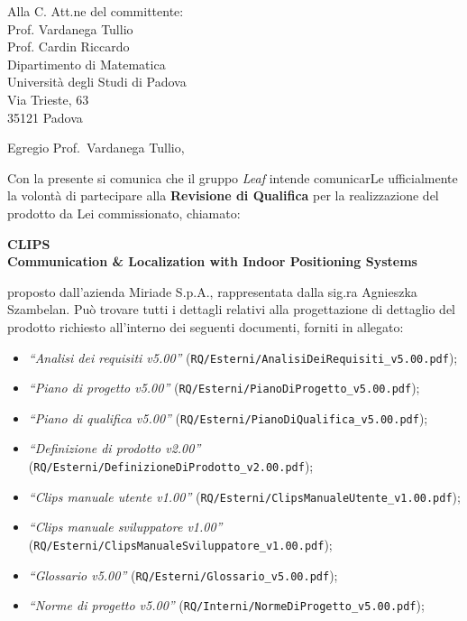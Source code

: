 \documentclass[a4paper,12pt]{letteracdp}
\author{Davide Castello}
\date{16 maggio 2016}
\begin{document}
	\begin{letter}{
		Alla C. Att.ne del committente: \\
		Prof. Vardanega Tullio \\
		Prof. Cardin Riccardo \\
		Dipartimento di Matematica \\
		Università degli Studi di Padova \\
		Via Trieste, 63 \\
		35121 Padova}
		
		\opening{Egregio Prof.~Vardanega Tullio,}
		Con la presente si comunica che il gruppo \textit{Leaf} intende comunicarLe ufficialmente la volontà di partecipare alla \textbf{Revisione di Qualifica} per la realizzazione del prodotto da Lei commissionato, chiamato:
\begin{center}
	\textbf{CLIPS \\ Communication \& Localization with Indoor Positioning Systems}
\end{center}
proposto dall'azienda Miriade S.p.A., rappresentata dalla sig.ra Agnieszka Szambelan.
Può trovare tutti i dettagli relativi alla progettazione di dettaglio del prodotto richiesto all'interno dei seguenti documenti, forniti in allegato:
%
\begin{itemize}
	\item \textit{“Analisi dei requisiti v5.00”} (\texttt{RQ/Esterni/AnalisiDeiRequisiti\_v5.00.pdf});

	\item \textit{“Piano di progetto v5.00”} (\texttt{RQ/Esterni/PianoDiProgetto\_v5.00.pdf});

	\item \textit{“Piano di qualifica v5.00”} (\texttt{RQ/Esterni/PianoDiQualifica\_v5.00.pdf});
	
	\item \textit{“Definizione di prodotto v2.00”} (\texttt{RQ/Esterni/DefinizioneDiProdotto\_v2.00.pdf});
	
	\item \textit{“Clips manuale utente v1.00”} (\texttt{RQ/Esterni/ClipsManualeUtente\_v1.00.pdf});
	
	\item \textit{“Clips manuale sviluppatore v1.00”} (\texttt{RQ/Esterni/ClipsManualeSviluppatore\_v1.00.pdf});
	
	\item \textit{“Glossario v5.00”} (\texttt{RQ/Esterni/Glossario\_v5.00.pdf});
	
	\item \textit{“Norme di progetto v5.00”} (\texttt{RQ/Interni/NormeDiProgetto\_v5.00.pdf});


\end{itemize}
\end{letter}
\end{document}

